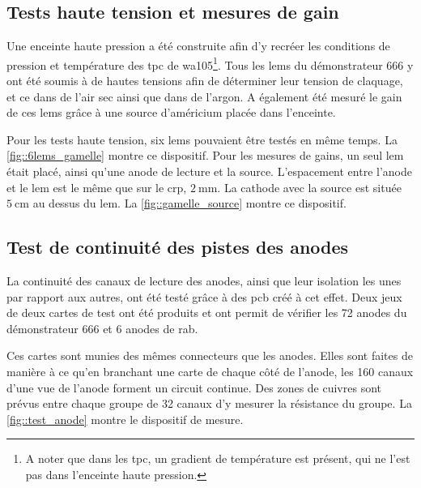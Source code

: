         
        \subsection{Tests haute tension et mesures de gain}\label{sec::test_HT}
            
            Une enceinte haute pression a été construite afin d'y recréer les conditions de pression et température des \gls{tpc} de \gls{wa105}\footnote{A noter que dans les \gls{tpc}, un gradient de température est présent, qui ne l'est pas dans l'enceinte haute pression.}. Tous les \glspl{lem} du démonstrateur 666 y ont été soumis à de hautes tensions afin de déterminer leur tension de claquage, et ce dans de l'air sec ainsi que dans de l'argon. A également été mesuré le gain de ces \glspl{lem} grâce à une source d'américium placée dans l'enceinte.
            
            Pour les tests haute tension, six \glspl{lem} pouvaient être testés en même temps. La \autoref{fig::6lems_gamelle} montre  ce dispositif. Pour les mesures de gains, un seul \gls{lem} était placé, ainsi qu'une anode de lecture et la source. L'espacement entre l'anode et le \gls{lem} est le même que sur le \gls{crp}, $\SI{2}{\milli\meter}$. La cathode avec la source est située $\SI{5}{\centi\meter}$ au dessus du \gls{lem}. La \autoref{fig::gamelle_source} montre ce dispositif.
        
        \subsection{Test de continuité des pistes des anodes}\label{sec::test_anode}
        
            La continuité des canaux de lecture des anodes, ainsi que leur isolation les unes par rapport aux autres, ont été testé grâce à des \gls{pcb} créé à cet effet. Deux jeux de deux cartes de test ont été produits et ont permit de vérifier les 72 anodes du démonstrateur 666 et 6 anodes de rab.
            
            Ces cartes sont munies des mêmes connecteurs que les anodes. Elles sont faites de manière à ce qu'en branchant une carte de chaque côté de l'anode, les 160 canaux d'une vue de l'anode forment un circuit continue. Des zones de cuivres sont prévus entre chaque groupe de 32 canaux d'y mesurer la résistance du groupe. La \autoref{fig::test_anode} montre le dispositif de mesure.
            
